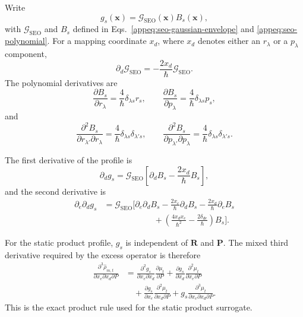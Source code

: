 \documentclass[
  11pt,
  letterpaper,
  onehalfspacing,
  normalmargins,
  equalmargins,
  oneside
]{ut-thesis}
\begin{document}
Write
\[
g_s(\mathbf x)
=
\mathcal G_{\mathrm{SEO}}(\mathbf x)
B_s(\mathbf x),
\]
with \(\mathcal G_{\mathrm{SEO}}\) and \(B_s\) defined in
Eqs.~\eqref{appeq:seo-gaussian-envelope} and
\eqref{appeq:seo-polynomial}.  For a mapping coordinate \(x_d\), where
\(x_d\) denotes either an \(r_\lambda\) or a \(p_\lambda\) component,
\begin{equation}
\partial_d
\mathcal G_{\mathrm{SEO}}
=
-\frac{2x_d}{\hbar}
\mathcal G_{\mathrm{SEO}}.
\label{appeq:seo-envelope-first}
\end{equation}
The polynomial derivatives are
\begin{equation}
\frac{\partial B_s}{\partial r_\lambda}
=
\frac{4}{\hbar}
\delta_{\lambda s}r_s,
\qquad
\frac{\partial B_s}{\partial p_\lambda}
=
\frac{4}{\hbar}
\delta_{\lambda s}p_s,
\label{appeq:seo-polynomial-first}
\end{equation}
and
\begin{equation}
\frac{\partial^2B_s}
{\partial r_{\lambda'}\partial r_\lambda}
=
\frac{4}{\hbar}
\delta_{\lambda s}\delta_{\lambda's},
\qquad
\frac{\partial^2B_s}
{\partial p_{\lambda'}\partial p_\lambda}
=
\frac{4}{\hbar}
\delta_{\lambda s}\delta_{\lambda's}.
\label{appeq:seo-polynomial-second}
\end{equation}

The first derivative of the profile is
\begin{equation}
\partial_d g_s
=
\mathcal G_{\mathrm{SEO}}
\left[
\partial_dB_s
-
\frac{2x_d}{\hbar}B_s
\right],
\label{appeq:seo-profile-first}
\end{equation}
and the second derivative is
\begin{align}
\partial_e\partial_d g_s
&=
\mathcal G_{\mathrm{SEO}}
\Bigg[
\partial_e\partial_dB_s
-
\frac{2x_e}{\hbar}\partial_dB_s
-
\frac{2x_d}{\hbar}\partial_eB_s
\nonumber\\
&\hspace{6em}
+
\left(
\frac{4x_dx_e}{\hbar^2}
-
\frac{2\delta_{de}}{\hbar}
\right)
B_s
\Bigg].
\label{appeq:seo-profile-second}
\end{align}

For the static product profile, \(g_s\) is independent of \(\mathbf R\) and
\(\mathbf P\).  The mixed third derivative required by the excess operator is
therefore
\begin{align}
\frac{\partial^3\widehat{\rho}_{m,t}}
{\partial x_e\partial x_d\partial P}
&=
\frac{\partial^2g_s}
{\partial x_e\partial x_d}
\frac{\partial\mu_t}{\partial P}
+
\frac{\partial g_s}{\partial x_d}
\frac{\partial^2\mu_t}
{\partial x_e\partial P}
\nonumber\\
&\quad
+
\frac{\partial g_s}{\partial x_e}
\frac{\partial^2\mu_t}
{\partial x_d\partial P}
+
g_s
\frac{\partial^3\mu_t}
{\partial x_e\partial x_d\partial P}.
\label{appeq:static-product-third}
\end{align}
This is the exact product rule used for the static product surrogate.
\end{document}
